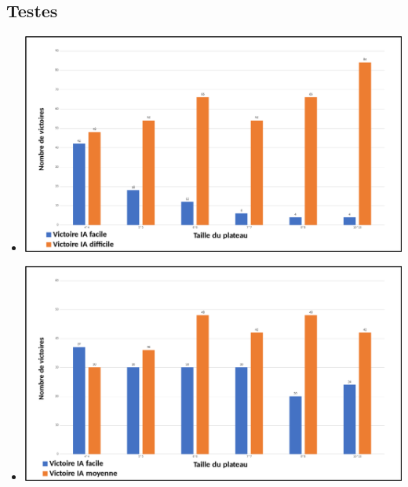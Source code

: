 \documentclass{beamer}
\begin{document}
\subsection{Testes}
\begin{frame}{}
\begin{block}{}
\begin{itemize}
 \item<1-> \includegraphics[scale=0.2]{IA10}
 \item<2-> \includegraphics[scale=0.2]{IA11}
\end{itemize}
\end{block}
\end{frame}
\end{document}
